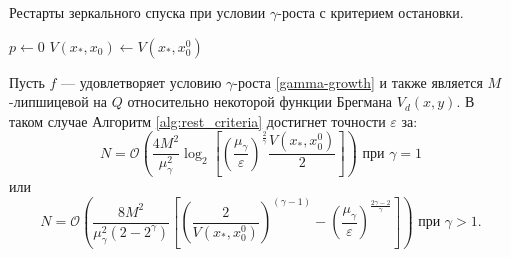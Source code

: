      \begin{algorithm}[htp]
        \caption{Рестарты зеркального спуска при условии $\gamma$-роста с критерием остановки.}
        \label{alg:rest_criteria}
        $p \gets 0$\;
        $V(x_*, x_0) \gets V(x_*,x_0^0)$\;
    \end{algorithm}
    \begin{theorem}
        Пусть $f$ --- удовлетворяет условию $\gamma$-роста \eqref{gamma-growth} и также является $M$-липшицевой на $Q$ относительно некоторой функции Брегмана $V_d(x, y)$. В таком случае Алгоритм \ref{alg:rest_criteria} достигнет точности $\varepsilon$ за:
        \begin{equation}
           N = \mathcal{O}\left(\frac{4 M^2}{\mu_{\gamma}^2} \log_2{\left[\left(\frac{\mu_{\gamma}}{\varepsilon}\right)^{\frac{2}{\gamma}} \frac{V(x_*, x_0^0)}{2}\right]}\right) \text{ при } \gamma = 1
       \end{equation}
       или
       \begin{equation}
           N = \mathcal{O}\left(\frac{8  M^2}{\mu_{\gamma}^2 (2 - 2^{\gamma})} \left[ \left(\frac{2}{V(x_*, x_0^0)}\right)^{(\gamma - 1)}  - \left(\frac{\mu_{\gamma}}{\varepsilon}\right)^{\frac{2\gamma - 2}{\gamma}} \right]\right) \text{ при } \gamma > 1.
       \end{equation}
    \end{theorem}

